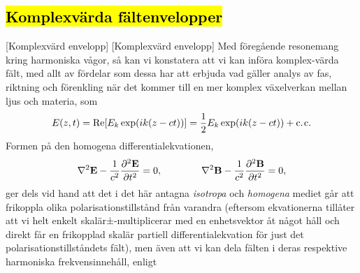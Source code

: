\subsection{{\hl{Komplexv{\"a}rda f{\"a}ltenvelopper}}}
[Komplexv{\"a}rd envelopp]
[Komplexv{\"a}rd envelopp]
Med f{\"o}reg{\aa}ende resonemang kring harmoniska v{\aa}gor, s{\aa} kan vi
konstatera att vi kan inf{\"o}ra komplex-v{\"a}rda f{\"a}lt, med allt av
f{\"o}rdelar som dessa har att erbjuda vad g{\"a}ller analys av fas, riktning
och f{\"o}renkling n{\"a}r det kommer till en mer komplex v{\"a}xelverkan
mellan ljus och materia, som
{\hl{$$
  E(z,t)=\Re[E_k\exp(ik(z-ct))]
    ={{1}\over{2}}E_k\exp(ik(z-ct))+\hbox{c.\kern1ptc.}
$$}}
Formen p{\aa} den homogena differentialekvationen,
\hl{$$
  \nabla^2{\bf E} - {{1}\over{c^2}}
    {{\partial^2{\bf E}}\over{\partial t^2}} = 0,
  \qquad\qquad
  \nabla^2{\bf B} - {{1}\over{c^2}}
    {{\partial^2{\bf B}}\over{\partial t^2}} = 0,
$$}
ger dels vid hand att det i det h{\"a}r antagna {\it isotropa} och
{\it homogena} mediet g{\aa}r att frikoppla olika polarisationstillst{\aa}nd
fr{\aa}n varandra (eftersom ekvationerna till{\aa}ter att vi helt enkelt
skal{\"a}r±-multipli\-cerar med en enhetsvektor {\aa}t n{\aa}got h{\aa}ll
och direkt f{\aa}r en frikopplad skal{\"a}r partiell differentialekvation
f{\"o}r just det polarisationstillst{\aa}ndets f{\"a}lt), men {\"a}ven att
vi kan dela f{\"a}lten i deras respektive harmoniska frekvensinneh{\aa}ll,
enligt

